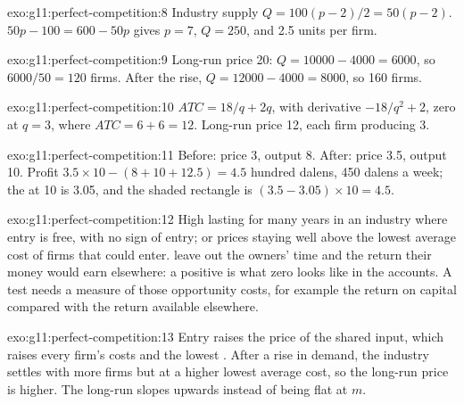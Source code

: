 \begin{solution}{exo:g11:perfect-competition:8}
Industry supply $Q = 100(p - 2)/2 = 50(p - 2)$. $50p - 100 = 600 - 50p$ gives $p = 7$, $Q = 250$, and 2.5 units per firm.
\end{solution}

\begin{solution}{exo:g11:perfect-competition:9}
Long-run price 20: $Q = 10000 - 4000 = 6000$, so $6000/50 = 120$ firms. After the rise, $Q = 12000 - 4000 = 8000$, so 160 firms.
\end{solution}

\begin{solution}{exo:g11:perfect-competition:10}
$\mathit{ATC} = 18/q + 2q$, with derivative $-18/q^2 + 2$, zero at $q = 3$, where $\mathit{ATC} = 6 + 6 = 12$. Long-run price 12, each firm producing 3.
\end{solution}

\begin{solution}{exo:g11:perfect-competition:11}
Before: price 3, output 8. After: price 3.5, output 10. Profit $3.5 \times 10 - (8 + 10 + 12.5) = 4.5$ hundred dalens, 450 dalens a week; the  at 10 is
3.05, and the shaded rectangle is $(3.5 - 3.05) \times 10 = 4.5$.
\end{solution}

\begin{solution}{exo:g11:perfect-competition:12}
High  lasting for many years in an industry where entry is free, with no sign of entry; or prices staying well above the lowest average cost of firms
that could enter.  leave out the owners' time and the return their money would earn elsewhere: a positive  is what zero  looks like in the accounts. A test needs a measure of those opportunity costs, for example the return on capital compared with the return available elsewhere.
\end{solution}

\begin{solution}{exo:g11:perfect-competition:13}
Entry raises the price of the shared input, which raises every firm's costs and the lowest . After a rise in demand, the industry settles with more
firms but at a higher lowest average cost, so the long-run price is higher. The long-run  slopes upwards instead of being flat at $m$.
\end{solution}

